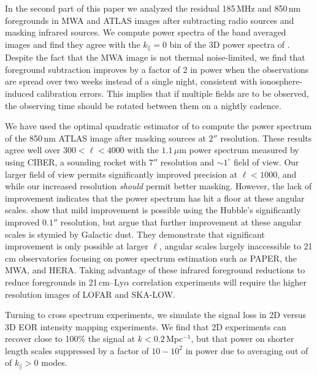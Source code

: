 \documentclass[numberedappendix]{emulateapj}
\begin{document}
In the second part of this paper we analyzed the residual 185\,MHz and 850\,nm foregrounds in MWA and ATLAS images after subtracting radio sources and masking infrared sources. We compute power spectra of the band averaged images and find they agree with the $k_\parallel=0$ bin of the 3D power spectra of \citet{beardsley16}. Despite the fact that the MWA image is not thermal noise-limited, we find that foreground subtraction improves by a factor of 2 in power when the observations are spread over two weeks instead of a single night, consistent with ionosphere-induced calibration errors. This implies that if multiple fields are to be observed, the observing time should be rotated between them on a nightly cadence. 

We have used the optimal quadratic estimator of \citet{Maxpowerspeclossless} to compute the power spectrum of the 850\,nm ATLAS image after masking sources at $2''$ resolution. These results agree well over $300<\ell<4000$ with the $1.1$\,$\mu$m power spectrum measured by \citep{zemcov14} using CIBER, a sounding rocket with $7''$ resolution and $\sim1^\circ$ field of view. Our larger field of view permits significantly improved precision at $\ell<1000$, and while our increased resolution \textit{should} permit better masking. However, the lack of improvement indicates that the power spectrum has hit a floor at these angular scales. \citet{mw15} show that mild improvement is possible using the Hubble's significantly improved $0.1''$ resolution, but argue that further improvement at these angular scales is stymied by Galactic dust. They demonstrate that significant improvement is only possible at larger $\ell$, angular scales largely inaccessible to 21\,cm observatories focusing on power spectrum estimation such as PAPER, the MWA, and HERA. Taking advantage of these infrared foreground reductions to reduce foregrounds in 21\,cm--Ly$\alpha$ correlation experiments will require the higher resolution images of  LOFAR and SKA-LOW.

Turning to cross spectrum experiments, we simulate the signal loss in 2D versus 3D EOR intensity mapping experiments. We find that 2D experiments can recover close to 100\% the signal at $k<0.2$\,Mpc$^{-1}$, but that power on shorter length scales  suppressed by a factor of $10-10^2$ in power due to averaging out of of $k_\parallel>0$ modes. 
\end{document}
